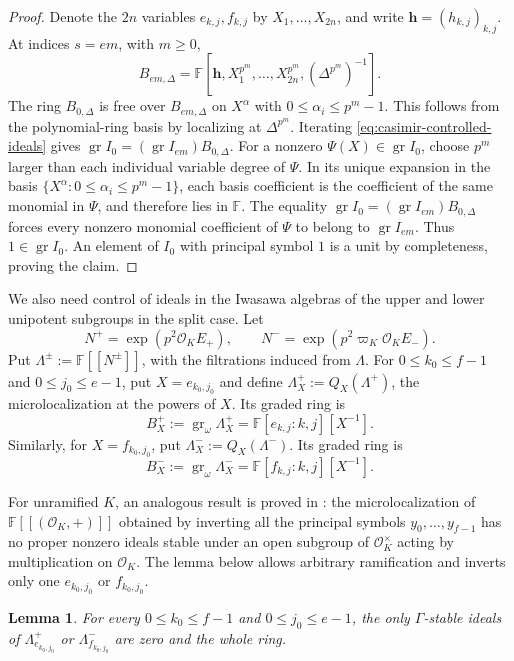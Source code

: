 \documentclass[11pt]{article}
\numberwithin{equation}{section}
\newtheorem{lemma}[theorem]{Lemma}
\theoremstyle{definition}
\theoremstyle{remark}
\newcommand{\F}{\mathbb F}
\newcommand{\cO}{\mathcal O}
\DeclareMathOperator{\gr}{gr}
\begin{document}
\begin{proof}
Denote the $2n$ variables $e_{k,j},f_{k,j}$ by
$X_1,\ldots,X_{2n}$, and write
$\boldsymbol h=(h_{k,j})_{k,j}$. At indices $s=em$, with $m\geq0$,
\[
 B_{em,\Delta}
 =\F[\boldsymbol h,X_1^{p^m},\ldots,X_{2n}^{p^m},(\Delta^{p^m})^{-1}].
\]
The ring $B_{0,\Delta}$ is free over $B_{em,\Delta}$ on
$X^\alpha$ with $0\leq\alpha_i\leq p^m-1$. This follows from the
polynomial-ring basis by localizing at $\Delta^{p^m}$.
Iterating \eqref{eq:casimir-controlled-ideals} gives
$\gr I_0=(\gr I_{em})B_{0,\Delta}$.
For a nonzero $\Psi(X)\in\gr I_0$, choose $p^m$ larger than
each individual variable degree of $\Psi$. In its unique expansion
in the basis $\{X^\alpha:0\leq\alpha_i\leq p^m-1\}$, each basis
coefficient is the coefficient of the same monomial in $\Psi$,
and therefore lies in $\F$. The equality
$\gr I_0=(\gr I_{em})B_{0,\Delta}$ forces every nonzero monomial
coefficient of $\Psi$ to belong to $\gr I_{em}$. Thus $1\in\gr I_0$. An element of $I_0$ with
principal symbol $1$ is a unit by completeness, proving the claim.
\end{proof}

We also need control of ideals in the Iwasawa algebras of the
upper and lower unipotent subgroups in the split case.
Let
\[
 N^+=\exp(p^2\cO_KE_+),\qquad
 N^-=\exp(p^2\varpi_K\cO_KE_-).
\]
Put $\Lambda^\pm:=\F[[N^\pm]]$, with the filtrations induced from $\Lambda$.
For $0\leq k_0\leq f-1$ and $0\leq j_0\leq e-1$, put $X=e_{k_0,j_0}$
and define $\Lambda_X^+:=Q_X(\Lambda^+)$, the microlocalization at
the powers of $X$. Its graded ring is
\[
 B_X^{+}:=\gr_\omega\Lambda_X^{+}
             =\F[e_{k,j}:k,j][X^{-1}].
\]
Similarly, for $X=f_{k_0,j_0}$, put $\Lambda_X^-:=Q_X(\Lambda^-)$.
Its graded ring is
\[
 B_X^{-}:=\gr_\omega\Lambda_X^{-}
             =\F[f_{k,j}:k,j][X^{-1}].
\]

For unramified $K$, an analogous result is proved in
\cite[Cor.~3.7]{BHH25}: the microlocalization of $\F[[(\cO_K,+)]]$
obtained by inverting all the principal symbols
$y_0,\ldots,y_{f-1}$ has no proper nonzero ideals stable under an
open subgroup of $\cO_K^\times$ acting by multiplication on $\cO_K$.
The lemma below allows arbitrary ramification and inverts only one
$e_{k_0,j_0}$ or $f_{k_0,j_0}$.

\begin{lemma}\label{lem:casimir-unipotent-rigidity}
For every $0\leq k_0\leq f-1$ and $0\leq j_0\leq e-1$, the only
$\Gamma$-stable ideals of $\Lambda_{e_{k_0,j_0}}^{+}$ or
$\Lambda_{f_{k_0,j_0}}^{-}$ are zero and the whole ring.
\end{lemma}
\end{document}

